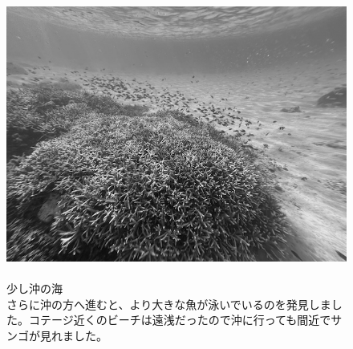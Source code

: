 \documentclass[../main]{subfiles}
\begin{document}
\begin{figure}[H]
  \begin{minipage}[b]{0.48\columnwidth}
    \caption{\\
    少し沖の海\\
    さらに沖の方へ進むと、より大きな魚が泳いでいるのを発見しました。コテージ近くのビーチは遠浅だったので沖に行っても間近でサンゴが見れました。
    }
  \end{minipage}
  \hspace{0.04\columnwidth} %
  \begin{minipage}[b]{0.48\columnwidth}
    \centering
    \includegraphics[width=\columnwidth]{figure/okinoumi.jpg}
  \end{minipage}
\end{figure}
\end{document}
